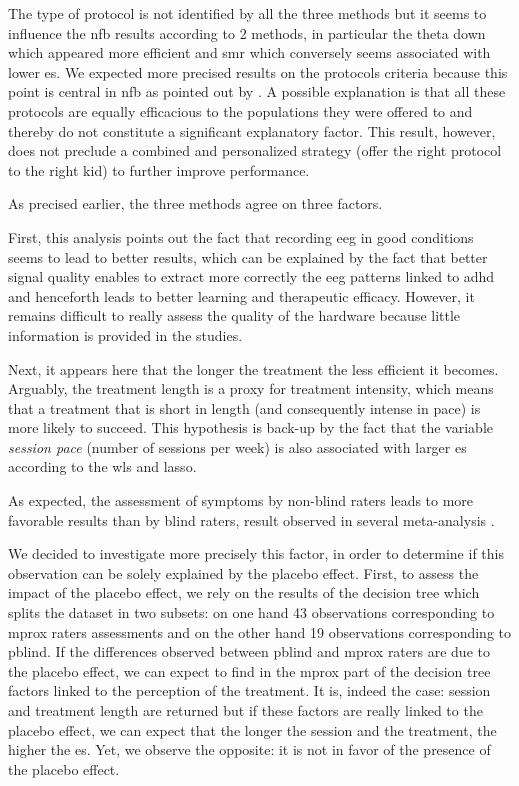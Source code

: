 The type of protocol is not identified by all the three methods but it seems to influence the \gls{nfb} results according to 2 methods,  
in particular the theta down which appeared more efficient and \gls{smr} which conversely seems associated with lower \gls{es}. We expected 
more precised results on the protocols criteria because this point is central in \gls{nfb} as pointed out by \citet{Vernon2004}.
A possible explanation is that all these protocols are equally efficacious to the populations they were offered to and 
thereby do not constitute a significant explanatory factor. This result, however, does not preclude a combined and personalized strategy 
(offer the right protocol to the right kid) to further improve performance. 

As precised earlier, the three methods agree on three factors.

First, this analysis points out the fact that recording \gls{eeg} in good conditions seems to lead to better results, 
which can be explained by the fact that better signal quality enables to extract more correctly the \gls{eeg} 
patterns linked to \gls{adhd} and henceforth leads to better learning and therapeutic efficacy. However, it remains difficult to 
really assess the quality of the hardware because little information is provided in the studies.  

Next, it appears here that the longer the treatment the less efficient it becomes. Arguably, the treatment length is a proxy 
for treatment intensity, which means that a treatment that is short in length (and consequently intense in pace) 
is more likely to succeed. This hypothesis is back-up by the fact that the variable \emph{session pace} (number of sessions per week) 
is also associated with larger \gls{es} according to the \gls{wls} and \gls{lasso}. 

As expected, the assessment of symptoms by non-blind raters leads to more favorable results than by blind raters, 
result observed in several meta-analysis \citep{Cortese2016, Micoulaud2014}. 

We decided to investigate more precisely this factor, in order to determine if this observation can be solely explained by
the placebo effect. First, to assess the impact of the placebo effect, we rely on the results of the decision tree which splits
the dataset in two subsets: on one hand 43 observations corresponding to \gls{mprox} raters assessments and on the other hand 
19 observations corresponding to \gls{pblind}. If the differences observed between \gls{pblind} and \gls{mprox} raters are due
to the placebo effect, we can expect to find in the \gls{mprox} part of the decision tree factors linked to the perception 
of the treatment. It is, indeed the case: session and treatment length are returned but if these factors are really linked to the 
placebo effect, we can expect that the longer the session and the treatment, the higher the \gls{es}. Yet, we observe the opposite: 
it is not in favor of the presence of the placebo effect. 

